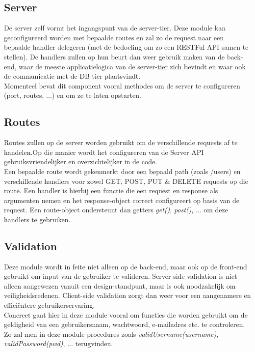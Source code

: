 \documentclass{article}
\begin{document}
\subsection{Server}

De server zelf vormt het ingangspunt van de server-tier. Deze module kan geconfigureerd worden met bepaalde routes en zal zo de request naar een bepaalde handler delegeren (met de bedoeling om zo een RESTFul API samen te stellen). De handlers zullen op hun beurt dan weer gebruik maken van de back-end, waar de meeste applicatielogica van de server-tier zich bevindt en waar ook de communicatie met de DB-tier plaatsvindt. \\

Momenteel bevat dit component vooral methodes om de server te configureren (port, routes, ...) en om ze te laten opstarten.

\subsection{Routes}

Routes zullen op de server worden gebruikt om de verschillende requests af te handelen.Op die manier wordt het configureren van de Server API gebruiksvriendelijker en overzichtelijker in de code. \\

Een bepaalde route wordt gekenmerkt door een bepaald path (zoals /users) en verschillende handlers voor zowel GET, POST, PUT \& DELETE requests op die route. Een handler is hierbij een functie die een request en response als argumenten nemen en het response-object correct configureert op basis van de request. Een route-object ondersteunt dan getters \textit{get()}, \textit{post()}, ... om deze handlers te gebruiken. 

\subsection{Validation}

Deze module wordt in feite niet alleen op de back-end, maar ook op de front-end gebruikt om input van de gebruiker te valideren. Server-side validation is niet alleen aangewezen vanuit een design-standpunt, maar is ook noodzakelijk om veiligheidsredenen. Client-side validation zorgt dan weer voor een aangenamere en effici\"entere gebruikerservaring. \\

Concreet gaat hier in deze module vooral om functies die worden gebruikt om de geldigheid van een gebruikersnaam, wachtwoord, e-mailadres etc. te controleren. Zo zal men in deze module procedures zoals \textit{validUsername(username)}, \textit{validPassword(pwd)}, ... terugvinden.
\end{document}
